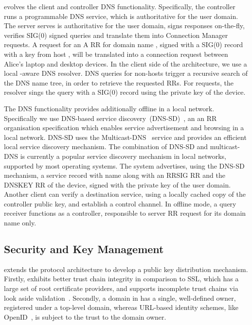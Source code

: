 \signpost evolves the \signpost client and controller DNS functionality.
Specifically, the controller runs a programmable DNS service, which is
authoritative for the user domain. The server serves is authoritative for the
user domain,  signs responses on-the-fly, verifies SIG(0) signed queries and
translate them into Connection Manager requests. A request for an A RR for
domain name , signed with a SIG(0) record with a key from
host , will be translated into a connection request between
Alice's laptop and desktop devices.  
In the client side of the \signpost architecture, we use a local \signpost-aware
DNS resolver. DNS queries for non-\signpost hosts trigger a recursive search of
the DNS name tree, in order to retrieve the requested RRs.  For \signpost 
requests, the resolver sings the query with a SIG(0) record using the private
key of the device. 

The DNS functionality provides additionally offline in a local network.
Specifically we use DNS-based service discovery~(DNS-SD)~, an an
RR organisation specification which enables service advertisement and browsing
in a local network. DNS-SD uses the Multicast-DNS~ service and
provides an efficient local service discovery mechanism. The combination of
DNS-SD and multicast-DNS is currently a popular service discovery mechanism in
local networks, supported by most operating systems.  The \signpost system
advertises, using the DNS-SD mechanism, a \signpost service record with name
 along with an RRSIG RR and the DNSKEY RR of the device,
signed with the private key of the user domain. Another \signpost client can
verify a destination \signpost service, using a locally cached copy of the
\signpost controller public key, and establish a control channel.  In offline
mode, a query receiver functions as a \signpost controller, responsible to
server RR request for its domain name only. 

\subsection{Security and Key Management} \label{signpost-security}

\signpost extends the \dnssec protocol architecture to develop a public key
distribution mechanism.  Firstly, \dnssec exhibits better trust chain integrity
in comparison to SSL, which has a large set of root certificate providers, and
supports incomplete trust chains via look aside validation~.
Secondly, a domain in \dnssec has a single, well-defined owner, registered under
a top-level domain, whereas URL-based identity schemes, like
OpenID~, is subject to the trust to the domain owner.

